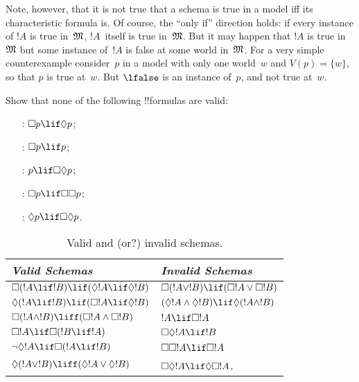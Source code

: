 \documentclass[../../../include/open-logic-section]{subfiles}
\begin{document}
Note, however, that it is not true that a schema is true in a model
iff its characteristic formula is. Of course, the ``only if''
direction holds: if every instance of $!A$ is true in~$\mModel{M}$,
$!A$~itself is true in~$\mModel{M}$. But it may happen that $!A$ is
true in~$\mModel{M}$ but some instance of~$!A$ is false at some world
in~$\mModel{M}$. For a very simple counterexample consider~$p$ in a
model with only one world~$w$ and $V(p) = \{w\}$, so that $p$ is true
at~$w$. But $\lfalse$ is an instance of~$p$, and not true at~$w$.

\begin{prob}
  Show that none of the following !!{formula}s are valid:
  \begin{enumerate}
    \item[\Ax{D}:] \quad $\Box p \lif \Diamond p$;
    \item[\Ax{T}:] \quad $\Box p \lif p$;
    \item[\Ax{B}:] \quad $p \lif \Box\Diamond p$;
    \item[\Ax{4}:] \quad $\Box p \lif \Box \Box p$;
    \item[\Ax{5}:] \quad $\Diamond p \lif \Box \Diamond
      p$.
  \end{enumerate}
\end{prob}

\begin{table}[t]
    \centering
    \begin{tabular}{| l || l |}
      \hline
      {\emph{Valid Schemas}} & {\emph{Invalid Schemas}} \\
      \hline\hline
      $\Box(!A \lif !B) \lif (\Diamond !A \lif \Diamond !B)$
      & $\Box (!A \lor !B) \lif (\Box !A \lor \Box !B)$ \\
      $\Diamond (!A \lif !B) \lif (\Box !A \lif \Diamond
      !B)$
      & $(\Diamond !A \land \Diamond !B) \lif \Diamond (!A
      \land !B)$\\
      $\Box (!A \land !B) \liff (\Box !A \land \Box !B)$
      & $!A \lif \Box !A$ \\
      $\Box !A \lif \Box (!B \lif !A)$
      & $\Box \Diamond !A \lif !B$ \\
      $\lnot \Diamond !A \lif \Box (!A \lif !B)$
      & $\Box \Box !A \lif \Box !A$ \\
      $\Diamond (!A \lor !B) \liff (\Diamond !A \lor
      \Diamond !B)$
      & $\Box \Diamond !A \lif \Diamond \Box !A$. \\
      \hline
    \end{tabular}
    \caption{Valid and (or?) invalid schemas.}
\end{table}
\end{document}
